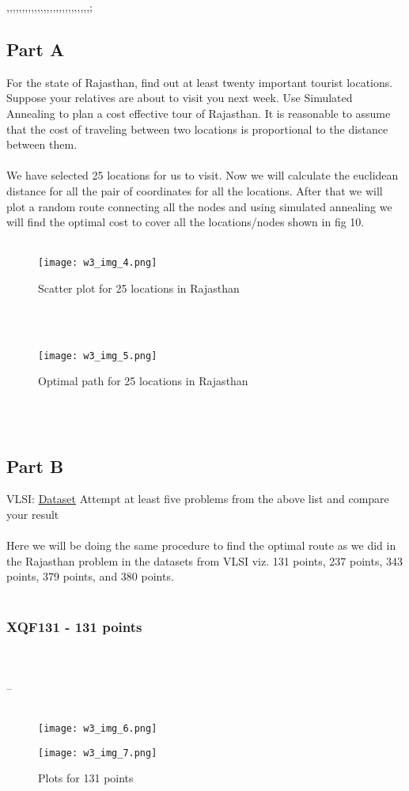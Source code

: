 ,,,,,,,,,,,,,,,,,,,,,,,,,,,;\documentclass[conference]{IEEEtran}
\begin{document}
\subsection{Part A}
 For the state of Rajasthan, find out at least twenty important tourist locations.  Suppose your relatives are about to visit you next week.  Use Simulated Annealing to plan a cost effective tour of Rajasthan.  It is reasonable to assume that the cost of traveling between two locations is proportional to the distance between them.
\\
\\
We have selected 25 locations for us to visit. Now we will calculate the euclidean distance for all the pair of coordinates for all the locations. After that we will plot a random route connecting all the nodes and using simulated annealing we will find the optimal cost to cover all the locations/nodes shown in fig 10.\cite{b4}
\\
\\
\begin{figure}[htbp]
\centerline{\texttt{[image: w3\_img\_4.png]}}
\caption{Scatter plot for 25 locations in Rajasthan}
\label{fig}
\end{figure}
\\
\\

\begin{figure}[htbp]
\centerline{\texttt{[image: w3\_img\_5.png]}}
\caption{Optimal path for 25 locations in Rajasthan}
\label{fig}
\end{figure}
\\
\\


\subsection{Part B}
VLSI: \href{http://www.math.uwaterloo.ca/tsp/vlsi/index.html}{Dataset}
Attempt at least five problems from the above list and compare
your result
\\
\\

Here we will be doing the same procedure to find the optimal route as we did in the Rajasthan problem in the datasets from VLSI viz. 131 points, 237 points, 343 points, 379 points, and 380 points.
\\
\\
\subsubsection{XQF131 - 131 points}
\\
\\
--
\\
\\
\begin{figure}[htbp]
\centerline{\texttt{[image: w3\_img\_6.png]}}

\label{fig}
\end{figure}
\begin{figure}[htbp]
\centerline{\texttt{[image: w3\_img\_7.png]}}
\caption{Plots for 131 points}
\label{fig}
\end{figure}
\\
\\
\end{document}
